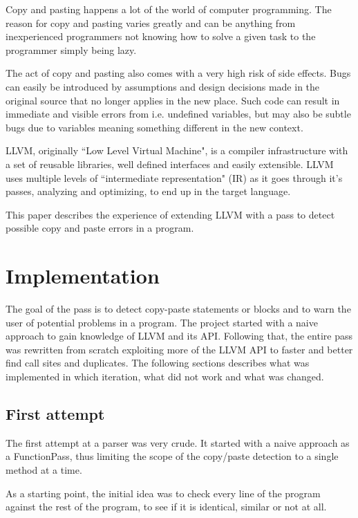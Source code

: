 \documentclass[a4paper,11pt]{article}
\theoremstyle{mytheor}
\begin{document}
Copy and pasting happens a lot of the world of computer programming.
The reason for copy and pasting varies greatly and can be anything from inexperienced programmers not knowing how to solve a given task to the programmer simply being lazy.

The act of copy and pasting also comes with a very high risk of side effects. Bugs can easily be introduced by assumptions and design decisions made in the original source that no longer applies in the new place.
Such code can result in immediate and visible errors from i.e. undefined variables, but may also be subtle bugs due to variables meaning something different in the new context.


LLVM, originally ``Low Level Virtual Machine", is a compiler infrastructure with a set of reusable libraries, well defined interfaces and easily extensible.
LLVM uses multiple levels of ``intermediate representation" (IR) as it goes through it's passes, analyzing and optimizing, to end up in the target language.

This paper describes the experience of extending LLVM with a pass to detect possible copy and paste errors in a program.

\section*{Implementation}
The goal of the pass is to detect copy-paste statements or blocks and to warn the user of potential problems in a program.
The project started with a naive approach to gain knowledge of LLVM and its API.
Following that, the entire pass was rewritten from scratch exploiting more of the LLVM API to faster and better find call sites and duplicates. The following sections describes what was implemented in which iteration, what did not work and what was changed.

\subsection*{First attempt}
The first attempt at a parser was very crude.
It started with a naive approach as a FunctionPass, thus limiting the scope of the copy/paste detection to a single method at a time.

As a starting point, the initial idea was to check every line of the program against the rest of the program, to see if it is identical, similar or not at all.
\end{document}
